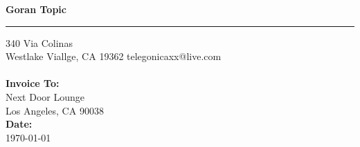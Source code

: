 \documentclass{invoice} %
\def \tab {\hspace*{3ex}} %
\begin{document}

\hfil{\Huge\bf Goran Topic}\hfil %
\bigskip\break %
\hrule %

340 Via Colinas \hfill  \\ %
Westlake Viallge, CA 19362 \hfill telegonicaxx@live.com
\\ \\
{\bf Invoice To:} \\
\tab Next Door Lounge \\ %
\tab Los Angeles, CA 90038 \\ %

{\bf Date:} \\
\tab \today \\ %


\begin{invoiceTable}




\end{invoiceTable}

\end{document}
